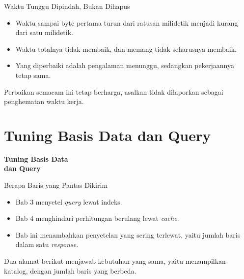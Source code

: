 \documentclass[aspectratio=169, table, 12pt]{beamer}
\begin{document}
\begin{frame}{{\Large Waktu Tunggu Dipindah, Bukan Dihapus}}
  \vspace{14pt}
  \begin{itemize}
    \item Waktu sampai byte pertama turun dari ratusan milidetik menjadi
          kurang dari satu milidetik.
    \item Waktu totalnya tidak membaik, dan memang tidak seharusnya membaik.
    \item Yang diperbaiki adalah pengalaman menunggu, sedangkan pekerjaannya
          tetap sama.
  \end{itemize}
  \vspace{10pt}
  {\footnotesize Perbaikan semacam ini tetap berharga, asalkan tidak
  dilaporkan sebagai penghematan waktu kerja.}
\end{frame}

\section{Tuning Basis Data dan Query}

\begin{frame}{\hfill}
  \centering
  \Huge{\textbf{Tuning Basis Data\\dan Query}}
\end{frame}

\begin{frame}{{\Large Berapa Baris yang Pantas Dikirim}}
  \vspace{14pt}
  \begin{itemize}
    \item Bab 3 menyetel \textit{query} lewat indeks.
    \item Bab 4 menghindari perhitungan berulang lewat \textit{cache}.
    \item Bab ini menambahkan penyetelan yang sering terlewat, yaitu jumlah
          baris dalam satu \textit{response}.
  \end{itemize}
  \vspace{10pt}
  {\footnotesize Dua alamat berikut menjawab kebutuhan yang sama, yaitu
  menampilkan katalog, dengan jumlah baris yang berbeda.}
\end{frame}
\end{document}
